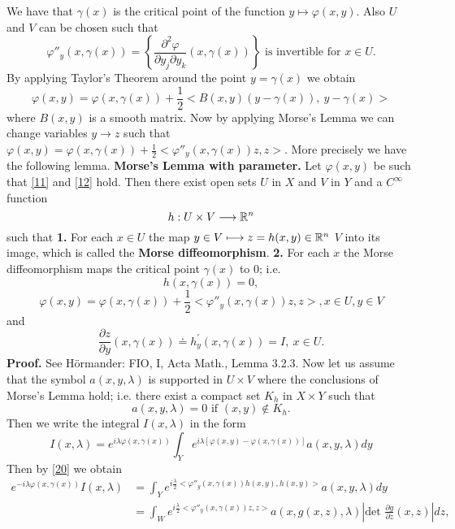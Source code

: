 \documentclass[12pt,reqno]{amsart}
\theoremstyle{plain}  %
\theoremstyle{definition}
\newcommand{\nin}{\noindent}
\newcommand{\vph}{\varphi}
\begin{document}
We have that $ \gamma(x) $ is the critical point of the function $ y \longmapsto
\vph (x,y)$.  Also $ U $ and $ V $ can be chosen such that 
\begin{equation}
	\label{15}
	\vph''_y(x, \gamma (x)) = \left \{ \frac{\partial^2 \vph}{\partial y_j \partial y_k} (x,
\gamma (x)) \right \} \text{ is invertible for } x \in U. 
\end{equation}
By applying Taylor's Theorem around the point $ y = \gamma (x) $ we obtain
$$\vph(x, y) = \vph (x, \gamma(x)) + \frac{1}{2} <B(x,y) (y-\gamma (x)), \ y -
\gamma (x) >$$
where $ B(x, y) $ is a smooth matrix.  Now by applying Morse's Lemma we can
change variables $ y \longrightarrow z $ such that $ \vph (x,y) = \vph(x,
\gamma(x)) + \frac{1}{2} <\vph''_y(x, \gamma (x)) z, z>$.  More precisely we have the following
lemma.
\vskip0.1in
\nin
{\bf Morse's Lemma with parameter.}  Let $ \vph (x,y) $ be such that
\eqref{11} and
\eqref{12} hold.  Then there exist open sets $ U $ in $ X $ and $ V $ in $ Y $ and a $
C^\infty $ function
$$h: U \times V \longrightarrow \Bbb R^n$$
such that
\vskip0.1in
\nin
{\bf 1.} For each $x \in U$  the map $y \in V \longmapsto z = h(x,y)
\in \Bbb R^n$  $V$  into its image, which is
called the {\bf Morse diffeomorphism}.
\vskip0.1in
\nin
{\bf 2.} For each $x$ the Morse diffeomorphism maps the critical
point $\gamma (x)$ to $0$; i.e.
\begin{equation}
	\label{19}
	h(x, \gamma (x)) = 0,
\end{equation}
\begin{equation}
	\label{20}
	\vph (x,y) = \vph (x, \gamma (x)) + 
\frac{1}{2} <\vph''_y(x, \gamma (x)) z, z>, x \in U, y \in V
\end{equation}
and
\begin{equation}
	\frac{\partial z}{\partial y} (x, \gamma (x)) \doteq h^\prime_y (x, \gamma
(x)) = I, \ x \in U. 
\end{equation}
\vskip0.1in
\nin
{\bf Proof.}  See H\"ormander:  FIO, I, Acta Math., Lemma 3.2.3.
\vskip0.1in
\nin
Now let us assume that the symbol $ a(x, y, \lambda) $ is supported in $ U
\times V $ where the conclusions of Morse's Lemma hold; i.e. there exist a
compact set $ K_h $ in $ X \times Y $ such that
$$a(x, y, \lambda) = 0 \text{ if } (x, y) \notin K_h. $$
Then we write the integral $ I(x, \lambda) $ in the form
$$I(x, \lambda) = e^{i \lambda \vph(x, \gamma (x))} \int_Y e^{i \lambda [\vph
(x,y) - \vph (x, \gamma (x))]} a(x, y, \lambda) dy $$
Then by \eqref{20} we obtain
\begin{align}
e^{-i \lambda \vph (x, \gamma (x))} I(x, \lambda) &= \int_Y e^{i
\frac{\lambda}{2} <\vph''_y(x, \gamma (x)) h(x,y), h(x, y)>} a(x, y, \lambda) dy\\
&= \int_W e^{i \frac{\lambda}{2} <\vph''_y(x, \gamma (x)) z, z>} 
a(x, g(x, z), \lambda)
|\text{det } \frac{\partial g}{\partial z} (x, z) |dz, \end{align}
\end{document}
